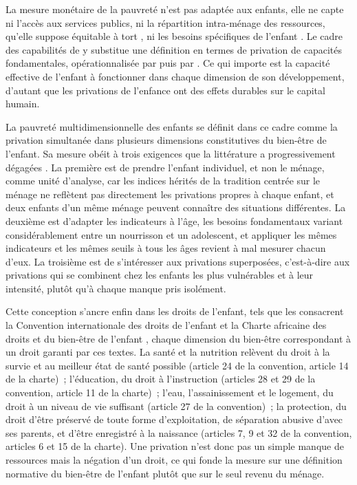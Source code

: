 La mesure monétaire de la pauvreté n'est pas adaptée aux enfants, elle ne capte
ni l'accès aux services publics, ni la répartition intra-ménage des ressources,
qu'elle suppose équitable à tort \parencite{deaton1997}, ni les besoins
spécifiques de l'enfant \parencite{gordon2003}. Le cadre des \og capabilités \fg{}
de \textcite{sen1999, sen1985} y substitue une définition en termes de privation
de capacités fondamentales, opérationnalisée par \textcite{townsend1979} puis
par \textcite{unicef2007}. Ce qui importe est la capacité effective de l'enfant
à fonctionner dans chaque dimension de son développement, d'autant que les
privations de l'enfance ont des effets durables sur le capital humain.

La pauvreté multidimensionnelle des enfants se définit dans ce cadre comme
la privation simultanée dans plusieurs dimensions constitutives du bien-être
de l'enfant. Sa mesure obéit à trois exigences que la littérature a
progressivement dégagées \parencite{roelen2008, deneubourg2012}. La première
est de prendre l'enfant individuel, et non le ménage, comme unité d'analyse,
car les indices hérités de la tradition centrée sur le ménage ne reflètent pas
directement les privations propres à chaque enfant, et deux enfants d'un
même ménage peuvent connaître des situations différentes. La deuxième est
d'adapter les indicateurs à l'âge, les besoins fondamentaux variant
considérablement entre un nourrisson et un adolescent, et appliquer les mêmes
indicateurs et les mêmes seuils à tous les âges revient à mal mesurer chacun
d'eux. La troisième est de
s'intéresser aux privations superposées, c'est-à-dire aux privations qui se
combinent chez les enfants les plus vulnérables et à leur intensité,
plutôt qu'à chaque manque pris isolément.

Cette conception s'ancre enfin dans les droits de l'enfant, tels que les
consacrent la Convention internationale des droits de l'enfant
\parencite{onu1989} et la Charte africaine des droits et du bien-être de
l'enfant \parencite{oua1990}, chaque dimension du bien-être correspondant à
un droit garanti par ces textes. La santé et la nutrition relèvent du droit
à la survie et au meilleur état de santé possible (article 24 de la convention,
article 14 de la charte)~; l'éducation, du droit à l'instruction
(articles 28 et 29 de la convention, article 11 de la charte)~; l'eau,
l'assainissement et le logement, du droit à un niveau de vie suffisant
(article 27 de la convention)~; la protection, du droit d'être préservé de toute
forme d'exploitation, de séparation abusive d'avec ses parents, et d'être
enregistré à la naissance (articles 7, 9 et 32 de la convention, articles 6 et 15
de la charte). Une privation n'est donc pas un simple manque de ressources
mais la négation d'un droit, ce qui fonde la mesure sur une définition
normative du bien-être de l'enfant plutôt que sur le seul revenu du ménage.

